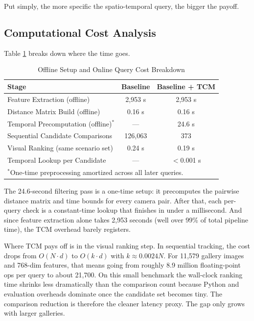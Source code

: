 \documentclass{ijitcs}
\newcommand{\rev}[1]{#1}
\begin{document}
Put simply, the more specific the spatio-temporal query, the bigger the payoff.


\subsection{Computational Cost Analysis}
Table \ref{tab:timing} breaks down where the time goes.

\begin{table}[htbp]
\caption{\rev{Offline Setup and Online Query Cost Breakdown}}
\begin{center}
\begin{tabular}{|l|c|c|}
\hline
\textbf{Stage} & \textbf{Baseline} & \textbf{Baseline + TCM} \\
\hline
Feature Extraction (offline) & 2,953 s & 2,953 s \\
\hline
Distance Matrix Build (offline) & 0.16 s & 0.16 s \\
\hline
\rev{Temporal Precomputation (offline)$^*$} & \rev{---} & \rev{24.6 s} \\
\hline
\rev{Sequential Candidate Comparisons} & \rev{126,063} & \rev{373} \\
\hline
Visual Ranking (same scenario set) & 0.24 s & 0.19 s \\
\hline
\rev{Temporal Lookup per Candidate} & \rev{---} & \rev{$<$0.001 s} \\
\hline
\multicolumn{3}{l}{\footnotesize \rev{$^*$One-time preprocessing amortized across all later queries.}} \\
\end{tabular}
\label{tab:timing}
\end{center}
\end{table}

The 24.6-second filtering pass is a one-time setup: it precomputes the pairwise distance matrix and time bounds for every camera pair. After that, each per-query check is a constant-time lookup that finishes in under a millisecond. And since feature extraction alone takes 2,953 seconds (well over 99\% of total pipeline time), the TCM overhead barely registers.

Where TCM pays off is in the visual ranking step. In sequential tracking, the cost drops from $O(N \cdot d)$ to $O(k \cdot d)$ with $k \approx 0.0024N$. For 11,579 gallery images and 768-dim features, that means going from roughly 8.9 million floating-point ops per query to about 21,700. \rev{On this small benchmark the wall-clock ranking time shrinks less dramatically than the comparison count because Python and evaluation overheads dominate once the candidate set becomes tiny. The comparison reduction is therefore the cleaner latency proxy.} The gap only grows with larger galleries.
\end{document}
